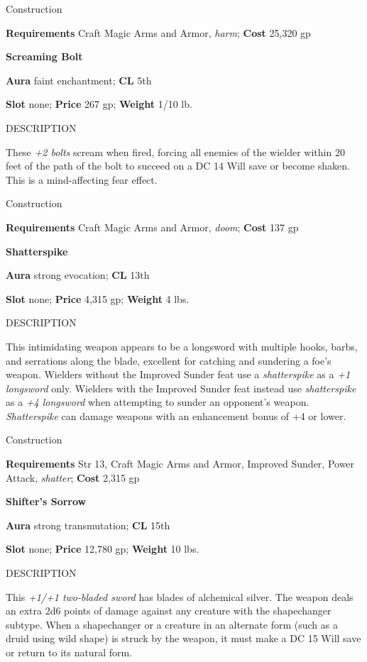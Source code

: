 Construction
				
\textbf{Requirements} Craft Magic Arms and Armor, \textit{harm}; \textbf{Cost }25,320 gp
				
\textbf{Screaming Bolt}
				
\textbf{Aura} faint enchantment;\textbf{ CL }5th
				
\textbf{Slot} none; \textbf{Price} 267 gp; \textbf{Weight} 1/10 lb.
				
DESCRIPTION
				
These \textit{+2 bolts} scream when fired, forcing all enemies of the wielder within 20 feet of the path of the bolt to succeed on a DC 14 Will save or become shaken. This is a mind-affecting fear effect. 
				
Construction
				
\textbf{Requirements} Craft Magic Arms and Armor, \textit{doom}; \textbf{Cost }137 gp
				
\textbf{Shatterspike}
				
\textbf{Aura} strong evocation;\textbf{ CL }13th
				
\textbf{Slot} none; \textbf{Price} 4,315 gp; \textbf{Weight} 4 lbs.
				
DESCRIPTION
				
This intimidating weapon appears to be a longsword with multiple hooks, barbs, and serrations along the blade, excellent for catching and sundering a foe's weapon. Wielders without the Improved Sunder feat use a \textit{shatterspike} as a \textit{+1 longsword} only. Wielders with the Improved Sunder feat instead use \textit{shatterspike} as a \textit{+4 longsword} when attempting to sunder an opponent's weapon. \textit{Shatterspike} can damage weapons with an enhancement bonus of +4 or lower.
				
Construction
				
\textbf{Requirements} Str 13, Craft Magic Arms and Armor, Improved Sunder, Power Attack, \textit{shatter}; \textbf{Cost }2,315 gp
				
\textbf{Shifter's Sorrow}
				
\textbf{Aura} strong transmutation;\textbf{ CL }15th
				
\textbf{Slot} none; \textbf{Price} 12,780 gp; \textbf{Weight} 10 lbs.
				
DESCRIPTION
				
This \textit{+1/+1 two-bladed sword} has blades of alchemical silver. The weapon deals an extra 2d6 points of damage against any creature with the shapechanger subtype. When a shapechanger or a creature in an alternate form (such as a druid using wild shape) is struck by the weapon, it must make a DC 15 Will save or return to its natural form. 
				
